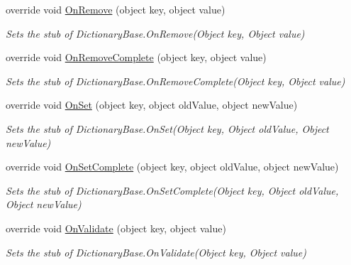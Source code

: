 \begin{DoxyCompactItemize}
override void \hyperlink{class_system_1_1_diagnostics_1_1_fakes_1_1_stub_instance_data_collection_collection_a122a92f3ddd0898b0be5a0e7d2552a37}{On\-Remove} (object key, object value)
\begin{DoxyCompactList}\small\item\em Sets the stub of Dictionary\-Base.\-On\-Remove(\-Object key, Object value)\end{DoxyCompactList}\item 
override void \hyperlink{class_system_1_1_diagnostics_1_1_fakes_1_1_stub_instance_data_collection_collection_ab350a8994ac36da4ae6fd3dc48473698}{On\-Remove\-Complete} (object key, object value)
\begin{DoxyCompactList}\small\item\em Sets the stub of Dictionary\-Base.\-On\-Remove\-Complete(\-Object key, Object value)\end{DoxyCompactList}\item 
override void \hyperlink{class_system_1_1_diagnostics_1_1_fakes_1_1_stub_instance_data_collection_collection_a66cd690728d9ca0236ece00ce7e2a987}{On\-Set} (object key, object old\-Value, object new\-Value)
\begin{DoxyCompactList}\small\item\em Sets the stub of Dictionary\-Base.\-On\-Set(\-Object key, Object old\-Value, Object new\-Value)\end{DoxyCompactList}\item 
override void \hyperlink{class_system_1_1_diagnostics_1_1_fakes_1_1_stub_instance_data_collection_collection_a1c9860df347eaab51df1b62f15027278}{On\-Set\-Complete} (object key, object old\-Value, object new\-Value)
\begin{DoxyCompactList}\small\item\em Sets the stub of Dictionary\-Base.\-On\-Set\-Complete(\-Object key, Object old\-Value, Object new\-Value)\end{DoxyCompactList}\item 
override void \hyperlink{class_system_1_1_diagnostics_1_1_fakes_1_1_stub_instance_data_collection_collection_a2753a0dd9b835c92342ac6af9dfb22d2}{On\-Validate} (object key, object value)
\begin{DoxyCompactList}\small\item\em Sets the stub of Dictionary\-Base.\-On\-Validate(\-Object key, Object value)\end{DoxyCompactList}\end{DoxyCompactItemize}
